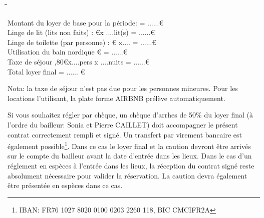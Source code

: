 \documentclass[a4paper,11pt]{article}
\begin{document}
\begin{tabbing}
  
 \hspace{6cm}\=  										\hspace{1cm}\=   	\hspace{4cm}\= 	\hspace{2cm}\= 		\hspace{2cm}\=	\kill


Montant du loyer de base pour la période: \>		\>		\>=			\>......\>\euro	   		\\

Linge de lit (lits non faits) :			 					\euro		      			\>x ....lit(s)       				\>=  			\>......\>\euro				\\



Linge de toilette (par personne) :					 					\euro      				\> x....							\>=  			\>......\>\euro				\\

Utilisation du bain nordique \euro		\>		\>=			\>......\>\euro	   		\\

Taxe de séjour ,80\euro		\>x....pers x ....nuits		\>=			\>......\>\euro	   		\\

Total loyer final    										\>						\>  					\>=  							\>......					\>\euro			\\ 

 \end{tabbing}

Nota: la taxe de séjour n'est pas due pour les personnes mineures. Pour les locations l'utilisant, la plate forme AIRBNB prélève automatiquement.


\vspace{0.5cm}

  
Si vous souhaitez régler par chèque, un chèque d'arrhes de 50\% du loyer final (à l'ordre du bailleur: Sonia et Pierre CAILLET)  doit accompagner le présent contrat correctement rempli et signé. 
Un transfert par virement bancaire est également possible\footnote{IBAN: FR76 1027 8020 0100 0203 2260 118, BIC CMCIFR2A}. Dans ce cas le loyer final et la caution devront être arrivés sur le compte du bailleur avant la date d'entrée dans les lieux.
Dans le cas d'un réglement en espèces à l'entrée dans les lieux, la réception du contrat signé reste absolument nécessaire pour valider la réservation. La caution devra également être présentée en espèces dans ce cas.
\end{document}
